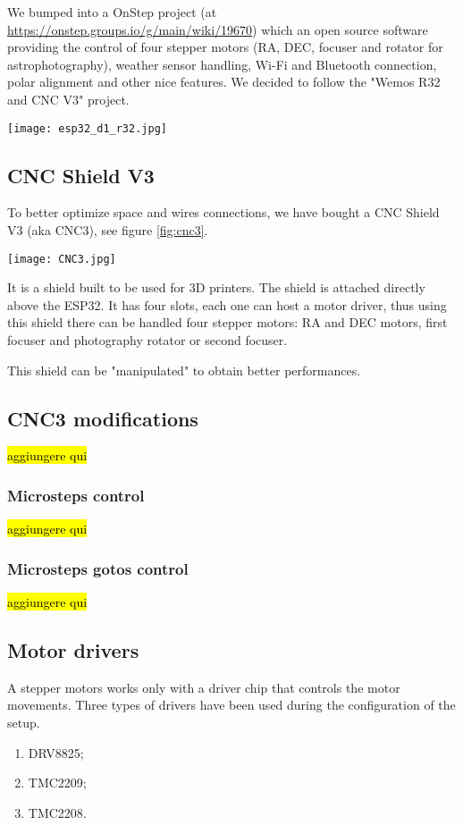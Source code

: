 We bumped into a OnStep project (at \url{https://onstep.groups.io/g/main/wiki/19670}) which an open source software providing the control of four stepper motors (RA, DEC, focuser and rotator for astrophotography), weather sensor handling, Wi-Fi and Bluetooth connection, polar alignment and other nice features.
We decided to follow the "Wemos R32 and CNC V3" project.

\begin{minipage}
    {.4\textwidth}
    \centering
    \texttt{[image: esp32\_d1\_r32.jpg]}
    \label{fig:esp32}
\end{minipage}

\subsection{CNC Shield V3}
To better optimize space and wires connections, we have bought a CNC Shield V3 (aka CNC3), see figure \ref{fig:cnc3}.
\begin{minipage}
    {0.5\textwidth}
    \centering
    \texttt{[image: CNC3.jpg]}
    \label{fig:cnc3}
\end{minipage}
It is a shield built to be used for 3D printers.
The shield is attached directly above the ESP32.
It has four slots, each one can host a motor driver, thus using this shield there can be handled four stepper motors: RA and DEC motors, first focuser and photography rotator or second focuser.

This shield can be "manipulated" to obtain better performances.

\subsection{CNC3 modifications}
\hl{aggiungere qui}
\subsubsection{Microsteps control}
\hl{aggiungere qui}

\subsubsection{Microsteps gotos control}
\hl{aggiungere qui}

\subsection{Motor drivers}
A stepper motors works only with a driver chip that controls the motor movements.
Three types of drivers have been used during the configuration of the setup.
\begin{enumerate}
    \item DRV8825;
    \item TMC2209;
    \item TMC2208.
\end{enumerate}

